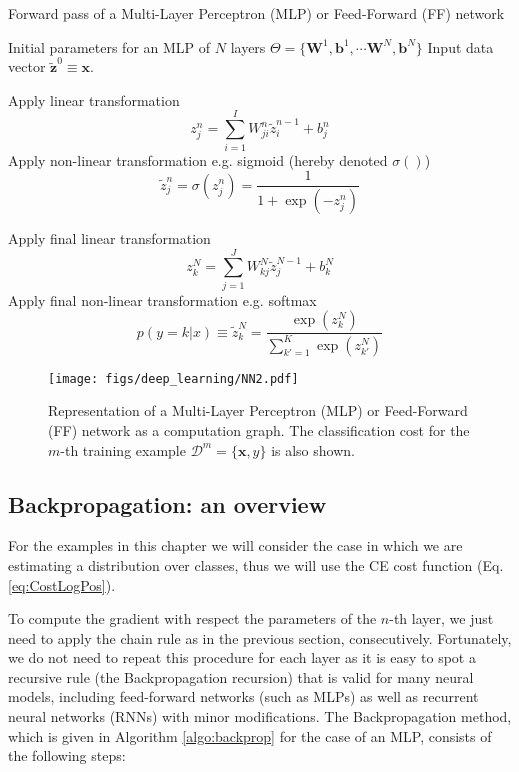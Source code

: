 \begin{algorithm}[th!]
   \caption{Forward pass of a Multi-Layer Perceptron (MLP) or Feed-Forward (FF) network}
\begin{algorithmic}[1]
\label{algo:mlpforward}

    Initial parameters for an MLP of $N$ layers $\Theta=\{\mathbf{W}^1, \mathbf{b}^1, \cdots \mathbf{W}^N, \mathbf{b}^N\}$
    Input data vector $\mathbf{\tilde{z}}^{0}  \equiv \mathbf{x}$.

     \STATE Apply  linear transformation
        $$z_j^n = \sum_{i=1}^{I} W_{ji}^n \tilde{z}_i^{n-1} + b_j^n$$
     \STATE Apply non-linear transformation e.g. sigmoid (hereby denoted $\sigma()$)
     $$\tilde{z}_j^n = \sigma(z_j^n)  = \frac{1}{1+\exp(-z_j^n)}$$

	\ENDFOR

\STATE Apply final linear transformation
   $$z_k^N = \sum_{j=1}^{J} W_{kj}^N \tilde{z}_j^{N-1} + b_k^N$$
\STATE Apply final non-linear transformation e.g. softmax
$$p(y=k|{x}) \equiv \tilde{z}_k^N = \frac{\exp(z_k^N)}{\sum_{k'=1}^{K} \exp(z_{k'}^N)}$$

\end{algorithmic}
\end{algorithm}

\begin{figure}[!hb]
\centering
\texttt{[image: figs/deep\_learning/NN2.pdf]}
\caption{Representation of a Multi-Layer Perceptron (MLP) or Feed-Forward (FF) network as a computation graph. The classification cost
for the $m$-th training example $\mathcal{D}^m=\{\mathbf{x}, y\}$ is also
shown.}
\label{fig:FF}
\end{figure}

\subsection{Backpropagation: an overview}

For the examples in this chapter we will consider the case in which we are
estimating a distribution over classes, thus we will use the CE cost function
(Eq. \ref{eq:CostLogPos}).

To compute the gradient with respect the parameters of the $n$-th layer, we
just need to apply the chain rule as in the previous section, consecutively.
Fortunately, we do not need to repeat this procedure for each layer as it is
easy to spot a recursive rule (the Backpropagation recursion) that is valid
for many neural models, including feed-forward networks (such as MLPs) as well
as recurrent neural networks (RNNs) with minor modifications. The
Backpropagation method, which is given in Algorithm \ref{algo:backprop} for
the case of an MLP, consists of the following steps:


